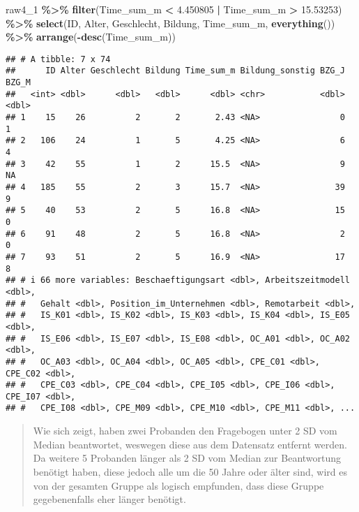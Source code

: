 \documentclass[
]{article}
\newenvironment{Shaded}{\begin{snugshade}}{\end{snugshade}}
\newcommand{\FloatTok}[1]{\textcolor[rgb]{0.00,0.00,0.81}{#1}}
\newcommand{\FunctionTok}[1]{\textcolor[rgb]{0.13,0.29,0.53}{\textbf{#1}}}
\newcommand{\NormalTok}[1]{#1}
\newcommand{\SpecialCharTok}[1]{\textcolor[rgb]{0.81,0.36,0.00}{\textbf{#1}}}
\begin{document}
\begin{Shaded}
\begin{Highlighting}[]
\NormalTok{raw4\_1 }\SpecialCharTok{\%\textgreater{}\%} 
  \FunctionTok{filter}\NormalTok{(Time\_sum\_m }\SpecialCharTok{\textless{}} \FloatTok{4.450805} \SpecialCharTok{|}\NormalTok{ Time\_sum\_m }\SpecialCharTok{\textgreater{}} \FloatTok{15.53253}\NormalTok{) }\SpecialCharTok{\%\textgreater{}\%} 
  \FunctionTok{select}\NormalTok{(ID, Alter, Geschlecht, Bildung, Time\_sum\_m, }\FunctionTok{everything}\NormalTok{()) }\SpecialCharTok{\%\textgreater{}\%} 
  \FunctionTok{arrange}\NormalTok{(}\SpecialCharTok{{-}}\FunctionTok{desc}\NormalTok{(Time\_sum\_m))}
\end{Highlighting}
\end{Shaded}

\begin{verbatim}
## # A tibble: 7 x 74
##      ID Alter Geschlecht Bildung Time_sum_m Bildung_sonstig BZG_J BZG_M
##   <int> <dbl>      <dbl>   <dbl>      <dbl> <chr>           <dbl> <dbl>
## 1    15    26          2       2       2.43 <NA>                0     1
## 2   106    24          1       5       4.25 <NA>                6     4
## 3    42    55          1       2      15.5  <NA>                9    NA
## 4   185    55          2       3      15.7  <NA>               39     9
## 5    40    53          2       5      16.8  <NA>               15     0
## 6    91    48          2       5      16.8  <NA>                2     0
## 7    93    51          2       5      16.9  <NA>               17     8
## # i 66 more variables: Beschaeftigungsart <dbl>, Arbeitszeitmodell <dbl>,
## #   Gehalt <dbl>, Position_im_Unternehmen <dbl>, Remotarbeit <dbl>,
## #   IS_K01 <dbl>, IS_K02 <dbl>, IS_K03 <dbl>, IS_K04 <dbl>, IS_E05 <dbl>,
## #   IS_E06 <dbl>, IS_E07 <dbl>, IS_E08 <dbl>, OC_A01 <dbl>, OC_A02 <dbl>,
## #   OC_A03 <dbl>, OC_A04 <dbl>, OC_A05 <dbl>, CPE_C01 <dbl>, CPE_C02 <dbl>,
## #   CPE_C03 <dbl>, CPE_C04 <dbl>, CPE_I05 <dbl>, CPE_I06 <dbl>, CPE_I07 <dbl>,
## #   CPE_I08 <dbl>, CPE_M09 <dbl>, CPE_M10 <dbl>, CPE_M11 <dbl>, ...
\end{verbatim}

\begin{quote}
Wie sich zeigt, haben zwei Probanden den Fragebogen unter 2 SD vom
Median beantwortet, weswegen diese aus dem Datensatz entfernt werden. Da
weitere 5 Probanden länger als 2 SD vom Median zur Beantwortung benötigt
haben, diese jedoch alle um die 50 Jahre oder älter sind, wird es von
der gesamten Gruppe als logisch empfunden, dass diese Gruppe
gegebenenfalls eher länger benötigt.
\end{quote}
\end{document}
